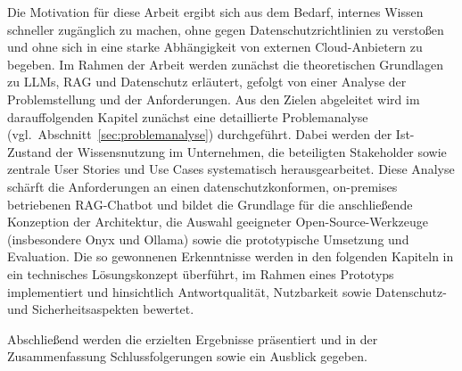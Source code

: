 Die Motivation für diese Arbeit ergibt sich aus dem Bedarf, internes Wissen schneller zugänglich zu machen, ohne gegen Datenschutzrichtlinien zu verstoßen und ohne sich in eine starke Abhängigkeit von externen Cloud-Anbietern zu begeben.
Im Rahmen der Arbeit werden zunächst die theoretischen Grundlagen zu LLMs, RAG und Datenschutz erläutert, gefolgt von einer Analyse der Problemstellung und der Anforderungen.
Aus den Zielen abgeleitet wird im darauffolgenden Kapitel zunächst eine detaillierte Problemanalyse (vgl.\ Abschnitt~\ref{sec:problemanalyse}) durchgeführt.
Dabei werden der Ist-Zustand der Wissensnutzung im Unternehmen, die beteiligten Stakeholder sowie zentrale User Stories und Use Cases systematisch herausgearbeitet.
Diese Analyse schärft die Anforderungen an einen datenschutzkonformen, on-premises betriebenen RAG-Chatbot und bildet die Grundlage für die anschließende Konzeption der Architektur, die Auswahl geeigneter Open-Source-Werkzeuge (insbesondere Onyx und Ollama) sowie die prototypische Umsetzung und Evaluation.
Die so gewonnenen Erkenntnisse werden in den folgenden Kapiteln in ein technisches Lösungskonzept überführt, im Rahmen eines Prototyps implementiert und hinsichtlich Antwortqualität, Nutzbarkeit sowie Datenschutz- und Sicherheitsaspekten bewertet.

Abschließend werden die erzielten Ergebnisse präsentiert und in der Zusammenfassung Schlussfolgerungen sowie ein Ausblick gegeben.
